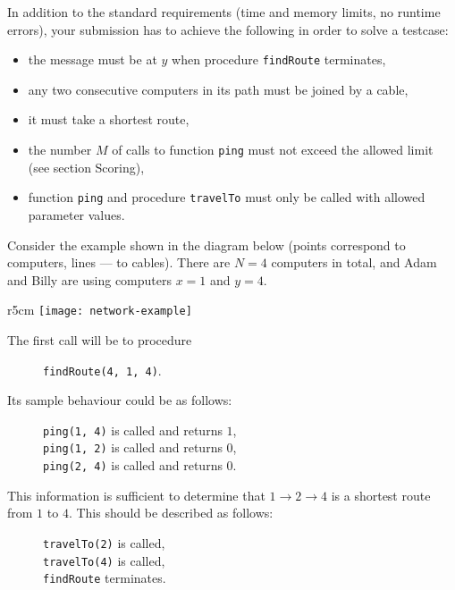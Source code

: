 \documentclass{boi2014}
\newcommand{\method}[1]{{\tt #1}}
\begin{document}
    In addition to the standard requirements (time and memory
    limits, no runtime errors), your submission has to achieve the following
    in order to solve a testcase:

    \begin{itemize}
        \item the message must be at $y$ when procedure \method{findRoute}
            terminates,
        \item any two consecutive computers in its path must be joined
            by a cable,
        \item it must take a shortest route,
        \item the number $M$ of calls to function \method{ping} must not
            exceed the allowed limit (see section Scoring),
        \item function \method{ping} and procedure \method{travelTo} must
            only be called with allowed parameter values.
    \end{itemize}

    \Example

    Consider the example shown in the diagram below (points correspond to
    computers, lines --- to cables). There are $N = 4$ computers in total,
    and Adam and Billy are using computers $x = 1$ and $y = 4$.

    \begin{wrapfigure}[1]{r}{5cm}
        \texttt{[image: network-example]}
    \end{wrapfigure}

    The first call will be to procedure
    \begin{figure}[H]
        \centering
        \method{findRoute(4, 1, 4)}.
    \end{figure}

    Its sample behaviour could be as follows:

    \begin{figure}[H]
        \centering
        \method{ping(1, 4)} is called and returns $1$, \\
        \method{ping(1, 2)} is called and returns $0$, \\
        \method{ping(2, 4)} is called and returns $0$.
    \end{figure}

    This information is sufficient to determine that $1 \to 2 \to 4$ is a
    shortest route from $1$ to $4$. This should be described as follows:

    \begin{figure}[H]
        \centering
        \method{travelTo(2)} is called, \\
        \method{travelTo(4)} is called, \\
        \method{findRoute} terminates.
    \end{figure}
\end{document}
